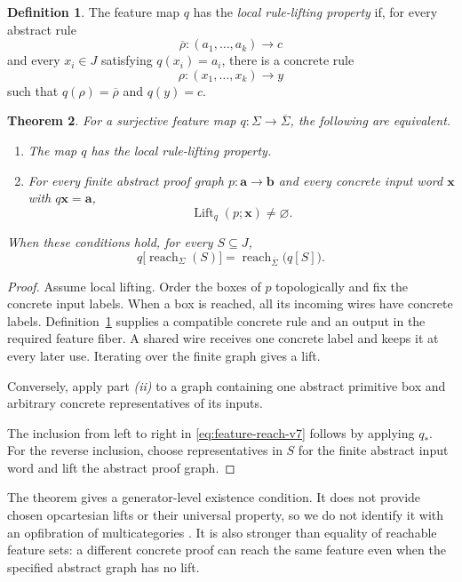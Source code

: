 \documentclass[10pt,journal,a4paper]{IEEEtran}
\newtheorem{theorem}{Theorem}[section]
\theoremstyle{definition}
\newtheorem{definition}[theorem]{Definition}
\begin{document}
\begin{definition}\label{def:local-lifting-v7}
The feature map $q$ has the \emph{local rule-lifting property} if, for every abstract rule
\[
  \overline\rho:(a_1,\ldots,a_k)\longrightarrow c
\]
and every $x_i\in J$ satisfying $q(x_i)=a_i$, there is a concrete rule
\[
  \rho:(x_1,\ldots,x_k)\longrightarrow y
\]
such that $q(\rho)=\overline\rho$ and $q(y)=c$.
\end{definition}

\begin{theorem}\label{thm:lifting-v7}
For a surjective feature map $q:\Sigma\to\overline\Sigma$, the following are equivalent.
\begin{enumerate}[label=\emph{(\roman*)}]
  \item The map $q$ has the local rule-lifting property.
  \item For every finite abstract proof graph $p:\mathbf a\to\mathbf b$ and every concrete input word $\mathbf x$ with $q\mathbf x=\mathbf a$,
  \[
    \operatorname{Lift}_q(p;\mathbf x)\neq\varnothing.
  \]
\end{enumerate}
When these conditions hold, for every $S\subseteq J$,
\begin{equation}\label{eq:feature-reach-v7}
  q\bigl[\operatorname{reach}_\Sigma(S)\bigr]
  =
  \operatorname{reach}_{\overline\Sigma}\bigl(q[S]\bigr).
\end{equation}
\end{theorem}

\begin{proof}
Assume local lifting. Order the boxes of $p$ topologically and fix the concrete input labels. When a box is reached, all its incoming wires have concrete labels. Definition~\ref{def:local-lifting-v7} supplies a compatible concrete rule and an output in the required feature fiber. A shared wire receives one concrete label and keeps it at every later use. Iterating over the finite graph gives a lift.

Conversely, apply part \emph{(ii)} to a graph containing one abstract primitive box and arbitrary concrete representatives of its inputs.

The inclusion from left to right in \eqref{eq:feature-reach-v7} follows by applying $q_*$. For the reverse inclusion, choose representatives in $S$ for the finite abstract input word and lift the abstract proof graph.
\end{proof}

The theorem gives a generator-level existence condition. It does not provide chosen opcartesian lifts or their universal property, so we do not identify it with an opfibration of multicategories \cite{Hermida2004}. It is also stronger than equality of reachable feature sets: a different concrete proof can reach the same feature even when the specified abstract graph has no lift.
\end{document}
